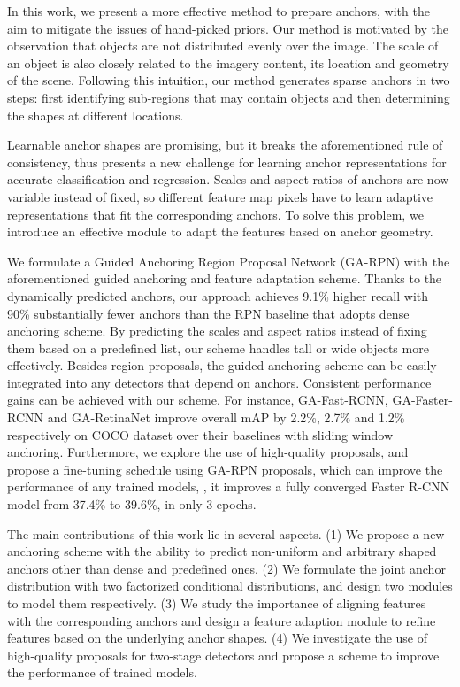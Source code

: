 \documentclass[10pt,twocolumn,letterpaper]{article}
\newcommand{\algname}{GA-RPN}
\begin{document}
In this work, we present a more effective method to prepare anchors,
with the aim to mitigate the issues of hand-picked priors.
Our method is motivated by the observation that objects are not distributed
evenly over the image.
The scale of an object is also closely related to the imagery content,
its location and geometry of the scene.
Following this intuition, our method generates sparse anchors in two steps:
first identifying sub-regions that may contain objects and then
determining the shapes at different locations.

Learnable anchor shapes are promising, but it breaks the aforementioned rule of consistency, thus presents a new challenge for learning anchor representations for accurate classification and regression.
Scales and aspect ratios of anchors are now variable instead of fixed,
so different feature map pixels have to learn adaptive representations that
fit the corresponding anchors.
To solve this problem, we introduce an effective module to adapt
the features based on anchor geometry.

We formulate a Guided Anchoring Region Proposal Network (\algname) with the
aforementioned guided anchoring and feature adaptation scheme.
Thanks to the dynamically predicted anchors, our approach achieves 9.1\%
higher recall with 90\% substantially fewer anchors than the RPN baseline
that adopts dense anchoring scheme.
By predicting the scales and aspect ratios instead of fixing them based on
a predefined list, our scheme handles tall or wide objects more effectively.
Besides region proposals, the guided anchoring scheme can be easily integrated
into any detectors that depend on anchors. Consistent performance gains can be achieved with our scheme.
For instance, GA-Fast-RCNN, GA-Faster-RCNN and GA-RetinaNet improve overall mAP by 2.2\%, 2.7\% and 1.2\%
respectively on COCO dataset over their baselines with sliding window anchoring.
Furthermore, we explore the use of high-quality proposals, and propose
a fine-tuning schedule using GA-RPN proposals, which can improve the performance
of any trained models, \eg, it improves a fully converged Faster R-CNN model
from 37.4\% to 39.6\%, in only $3$ epochs.

The main contributions of this work lie in several aspects.
(1) We propose a new anchoring scheme with the ability to predict non-uniform and
arbitrary shaped anchors other than dense and predefined ones.
(2) We formulate the joint anchor distribution with two factorized conditional
distributions, and design two modules to model them respectively.
(3) We study the importance of aligning features with the corresponding anchors
and design a feature adaption module to refine features based on the underlying
anchor shapes.
(4) We investigate the use of high-quality proposals for two-stage detectors
and propose a scheme to improve the performance of trained models. 
\end{document}
